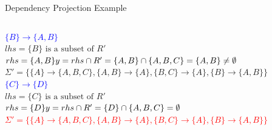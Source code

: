 \documentclass[UTF8]{beamer}
\begin{document}
\begin{frame}[fragile]{Dependency Projection Example}
\begin{columns}
\begin{column}{0.7\textwidth}
    \vspace{0.1cm}
    \pause
    \textcolor{blue}{$\{B\} \to \{A,B\}$}\\
    $lhs = \{B\} \text{ is a subset of } R'$\\
    $rhs = \{A,B\}\\
    y = rhs \cap R' = \{A,B\}\cap\{A,B,C\} = \{A,B\} \neq \emptyset$\\
    $\Sigma' = \{\{A\}\to \{A,B,C\}, \{A,B\} \to \{A\}, \{B,C\} \to \{A\}, \{B\} \to \{A,B\}\}$\\
    \vspace{0.1cm}
    \pause
    \textcolor{blue}{$\{C\} \to \{D\}$}\\
    $lhs = \{C\} \text{ is a subset of } R'$\\
    $rhs = \{D\}\\
    y = rhs \cap R' = \{D\}\cap\{A,B,C\} = \emptyset$\\
    \vspace{0.1cm}
    \pause
    \textcolor{red}{$\Sigma' = \{\{A\}\to \{A,B,C\}, \{A,B\} \to \{A\}, \{B,C\} \to \{A\}, \{B\} \to \{A,B\}\}$}
    \end{column}
\end{columns}
\end{frame}
\end{document}
